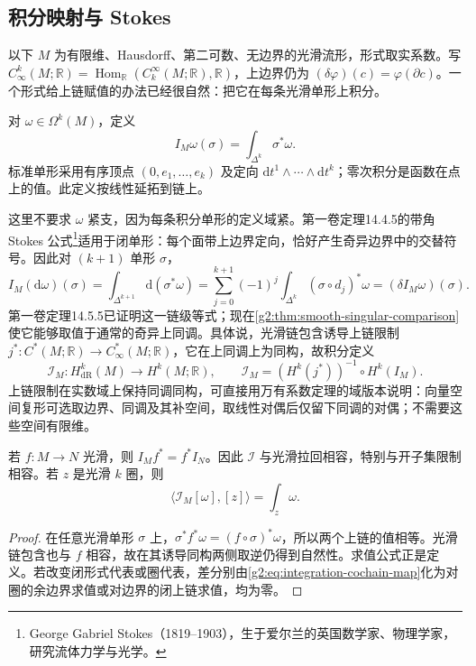\subsection{积分映射与 Stokes}
\label{g2:subsec:0703:02}
以下 \(M\) 为有限维、Hausdorff、第二可数、无边界的光滑流形，形式取实系数。写 \(C_\infty^k(M;\mathbb R)=\operatorname{Hom}_{\mathbb R}(C_k^\infty(M;\mathbb R),\mathbb R)\)，上边界仍为 \((\delta\varphi)(c)=\varphi(\partial c)\)。一个形式给上链赋值的办法已经很自然：把它在每条光滑单形上积分。

\begin{definition}\label{g2:def:integration-cochain}
	对 \(\omega\in\Omega^k(M)\)，定义
	\[
		I_M\omega(\sigma)=\int_{\Delta^k}\sigma^*\omega.
	\]
	标准单形采用有序顶点 \((0,e_1,\ldots,e_k)\) 及定向 \(\mathrm{d}t^1\wedge\cdots\wedge\mathrm{d}t^k\)；零次积分是函数在点上的值。此定义按线性延拓到链上。
\end{definition}

这里不要求 \(\omega\) 紧支，因为每条积分单形的定义域紧。第一卷定理14.4.5的带角 Stokes 公式\footnote{George Gabriel Stokes（1819--1903），生于爱尔兰的英国数学家、物理学家，研究流体力学与光学。}适用于闭单形：每个面带上边界定向，恰好产生奇异边界中的交替符号。因此对 \((k+1)\) 单形 \(\sigma\)，
\begin{equation}\label{g2:eq:integration-cochain-map}
	I_M(\mathrm{d}\omega)(\sigma)
	=\int_{\Delta^{k+1}}\mathrm{d}(\sigma^*\omega)
	=\sum_{j=0}^{k+1}(-1)^j\int_{\Delta^k}(\sigma\circ d_j)^*\omega
	=(\delta I_M\omega)(\sigma).
\end{equation}
第一卷定理14.5.5已证明这一链级等式；现在\cref{g2:thm:smooth-singular-comparison}使它能够取值于通常的奇异上同调。具体说，光滑链包含诱导上链限制 \(j^*:C^*(M;\mathbb R)\to C_\infty^*(M;\mathbb R)\)，它在上同调上为同构，故积分定义
\[
	\mathcal I_M:H_{\mathrm{dR}}^k(M)\longrightarrow H^k(M;\mathbb R),
	\qquad \mathcal I_M=(H^k(j^*))^{-1}\circ H^k(I_M).
\]
上链限制在实数域上保持同调同构，可直接用万有系数定理的域版本说明：向量空间复形可选取边界、同调及其补空间，取线性对偶后仅留下同调的对偶；不需要这些空间有限维。

\begin{proposition}\label{g2:prop:integration-naturality}
	若 \(f:M\to N\) 光滑，则 \(I_Mf^*=f^*I_N\)。因此 \(\mathcal I\) 与光滑拉回相容，特别与开子集限制相容。若 \(z\) 是光滑 \(k\) 圈，则
	\[
		\langle\mathcal I_M[\omega],[z]\rangle=\int_z\omega.
	\]
\end{proposition}
\begin{proof}
	在任意光滑单形 \(\sigma\) 上，\(\sigma^*f^*\omega=(f\circ\sigma)^*\omega\)，所以两个上链的值相等。光滑链包含也与 \(f\) 相容，故在其诱导同构两侧取逆仍得到自然性。求值公式正是定义。若改变闭形式代表或圈代表，差分别由\eqref{g2:eq:integration-cochain-map}化为对圈的余边界求值或对边界的闭上链求值，均为零。
\end{proof}


